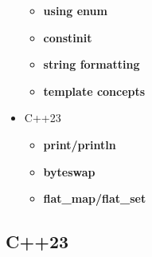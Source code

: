 \documentclass{article}
\begin{document}
\begin{itemize}
\begin{itemize}
		      \item \textbf{using enum}
		      \item \textbf{constinit}
		      \item \textbf{string formatting}
		      \item \textbf{template concepts}
	      \end{itemize}
	\item C++23
	      \begin{itemize}
		      \item \textbf{print/println}
		      \item \textbf{byteswap}
		      \item \textbf{flat\_map/flat\_set}
	      \end{itemize}
\end{itemize}
\subsection{C++23}
\end{document}
